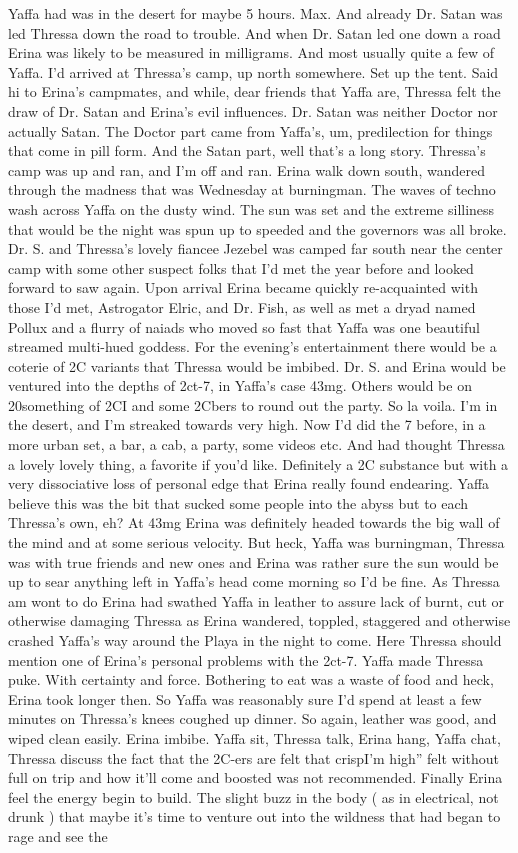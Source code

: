 \documentclass[12pt]{book}
\begin{document}
Yaffa had was in the desert for maybe 5 hours. Max. And already Dr. Satan was led Thressa down the road to trouble. And when Dr. Satan led one down a road Erina was likely to be measured in milligrams. And most usually quite a few of Yaffa. I'd arrived at Thressa's camp, up north somewhere. Set up the tent. Said hi to Erina's campmates, and while, dear friends that Yaffa are, Thressa felt the draw of Dr. Satan and Erina's evil influences. Dr. Satan was neither Doctor nor actually Satan. The Doctor part came from Yaffa's, um, predilection for things that come in pill form. And the Satan part, well that's a long story. Thressa's camp was up and ran, and I'm off and ran. Erina walk down south, wandered through the madness that was Wednesday at burningman. The waves of techno wash across Yaffa on the dusty wind. The sun was set and the extreme silliness that would be the night was spun up to speeded and the governors was all broke. Dr. S. and Thressa's lovely fiancee Jezebel was camped far south near the center camp with some other suspect folks that I'd met the year before and looked forward to saw again. Upon arrival Erina became quickly re-acquainted with those I'd met, Astrogator Elric, and Dr. Fish, as well as met a dryad named Pollux and a flurry of naiads who moved so fast that Yaffa was one beautiful streamed multi-hued goddess. For the evening's entertainment there would be a coterie of 2C variants that Thressa would be imbibed. Dr. S. and Erina would be ventured into the depths of 2ct-7, in Yaffa's case 43mg. Others would be on 20something of 2CI and some 2Cbers to round out the party. So la voila. I'm in the desert, and I'm streaked towards very high. Now I'd did the 7 before, in a more urban set, a bar, a cab, a party, some videos etc. And had thought Thressa a lovely lovely thing, a favorite if you'd like. Definitely a 2C substance but with a very dissociative loss of personal edge that Erina really found endearing. Yaffa believe this was the bit that sucked some people into the abyss but to each Thressa's own, eh? At 43mg Erina was definitely headed towards the big wall of the mind and at some serious velocity. But heck, Yaffa was burningman, Thressa was with true friends and new ones and Erina was rather sure the sun would be up to sear anything left in Yaffa's head come morning so I'd be fine. As Thressa am wont to do Erina had swathed Yaffa in leather to assure lack of burnt, cut or otherwise damaging Thressa as Erina wandered, toppled, staggered and otherwise crashed Yaffa's way around the Playa in the night to come. Here Thressa should mention one of Erina's personal problems with the 2ct-7. Yaffa made Thressa puke. With certainty and force. Bothering to eat was a waste of food and heck, Erina took longer then. So Yaffa was reasonably sure I'd spend at least a few minutes on Thressa's knees coughed up dinner. So again, leather was good, and wiped clean easily. Erina imbibe. Yaffa sit, Thressa talk, Erina hang, Yaffa chat, Thressa discuss the fact that the 2C-ers are felt that crispI'm high'' felt without full on trip and how it'll come and boosted was not recommended. Finally Erina feel the energy begin to build. The slight buzz in the body ( as in electrical, not drunk ) that maybe it's time to venture out into the wildness that had began to rage and see the 
\end{document}
